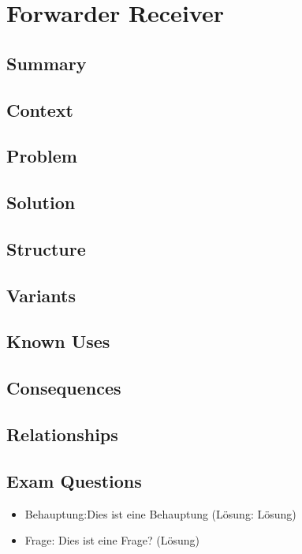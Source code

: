 \chapter{Forwarder Receiver}
\section{Summary}

\section{Context}

\section{Problem}

\section{Solution}

\section{Structure}

\section{Variants}

\section{Known Uses}

\section{Consequences}

\section{Relationships}

\section{Exam Questions}
\begin{itemize}
  	\item Behauptung:Dies ist eine Behauptung (Lösung: Lösung)
    \item Frage: Dies ist eine Frage? (Lösung)
\end{itemize}
